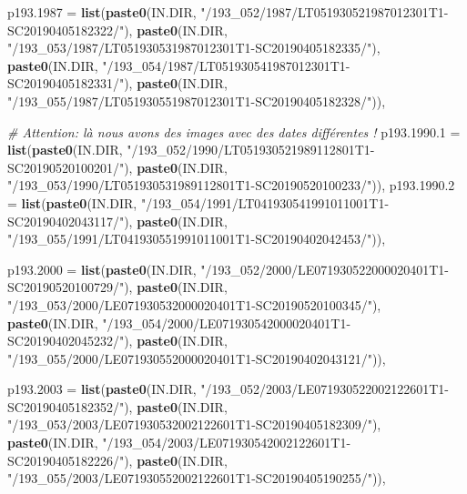\documentclass[a4paper, notitlepage, 12pt, krantz2]{krantz}
\newenvironment{Shaded}{\begin{snugshade}}{\end{snugshade}}
\newcommand{\CommentTok}[1]{\textcolor[rgb]{0.56,0.35,0.01}{\textit{#1}}}
\newcommand{\DataTypeTok}[1]{\textcolor[rgb]{0.13,0.29,0.53}{#1}}
\newcommand{\KeywordTok}[1]{\textcolor[rgb]{0.13,0.29,0.53}{\textbf{#1}}}
\newcommand{\NormalTok}[1]{#1}
\newcommand{\StringTok}[1]{\textcolor[rgb]{0.31,0.60,0.02}{#1}}
\begin{document}
\begin{Shaded}
\begin{Highlighting}[]
  \DataTypeTok{p193.1987 =} \KeywordTok{list}\NormalTok{(}\KeywordTok{paste0}\NormalTok{(IN.DIR, }\StringTok{"/193_052/1987/LT051930521987012301T1-SC20190405182322/"}\NormalTok{),}
                   \KeywordTok{paste0}\NormalTok{(IN.DIR, }\StringTok{"/193_053/1987/LT051930531987012301T1-SC20190405182335/"}\NormalTok{),}
                   \KeywordTok{paste0}\NormalTok{(IN.DIR, }\StringTok{"/193_054/1987/LT051930541987012301T1-SC20190405182331/"}\NormalTok{),}
                   \KeywordTok{paste0}\NormalTok{(IN.DIR, }\StringTok{"/193_055/1987/LT051930551987012301T1-SC20190405182328/"}\NormalTok{)),}

  \CommentTok{# Attention: là nous avons des images avec des dates différentes !}
  \DataTypeTok{p193.1990.1 =} \KeywordTok{list}\NormalTok{(}\KeywordTok{paste0}\NormalTok{(IN.DIR, }\StringTok{"/193_052/1990/LT051930521989112801T1-SC20190520100201/"}\NormalTok{),}
                     \KeywordTok{paste0}\NormalTok{(IN.DIR, }\StringTok{"/193_053/1990/LT051930531989112801T1-SC20190520100233/"}\NormalTok{)),}
  \DataTypeTok{p193.1990.2 =} \KeywordTok{list}\NormalTok{(}\KeywordTok{paste0}\NormalTok{(IN.DIR, }\StringTok{"/193_054/1991/LT041930541991011001T1-SC20190402043117/"}\NormalTok{),}
                     \KeywordTok{paste0}\NormalTok{(IN.DIR, }\StringTok{"/193_055/1991/LT041930551991011001T1-SC20190402042453/"}\NormalTok{)),}

  \DataTypeTok{p193.2000 =} \KeywordTok{list}\NormalTok{(}\KeywordTok{paste0}\NormalTok{(IN.DIR, }\StringTok{"/193_052/2000/LE071930522000020401T1-SC20190520100729/"}\NormalTok{),}
                   \KeywordTok{paste0}\NormalTok{(IN.DIR, }\StringTok{"/193_053/2000/LE071930532000020401T1-SC20190520100345/"}\NormalTok{),}
                   \KeywordTok{paste0}\NormalTok{(IN.DIR, }\StringTok{"/193_054/2000/LE071930542000020401T1-SC20190402045232/"}\NormalTok{),}
                   \KeywordTok{paste0}\NormalTok{(IN.DIR, }\StringTok{"/193_055/2000/LE071930552000020401T1-SC20190402043121/"}\NormalTok{)),}

  \DataTypeTok{p193.2003 =} \KeywordTok{list}\NormalTok{(}\KeywordTok{paste0}\NormalTok{(IN.DIR, }\StringTok{"/193_052/2003/LE071930522002122601T1-SC20190405182352/"}\NormalTok{),}
                   \KeywordTok{paste0}\NormalTok{(IN.DIR, }\StringTok{"/193_053/2003/LE071930532002122601T1-SC20190405182309/"}\NormalTok{),}
                   \KeywordTok{paste0}\NormalTok{(IN.DIR, }\StringTok{"/193_054/2003/LE071930542002122601T1-SC20190405182226/"}\NormalTok{),}
                   \KeywordTok{paste0}\NormalTok{(IN.DIR, }\StringTok{"/193_055/2003/LE071930552002122601T1-SC20190405190255/"}\NormalTok{)),}


\end{Highlighting}
\end{Shaded}
\end{document}
